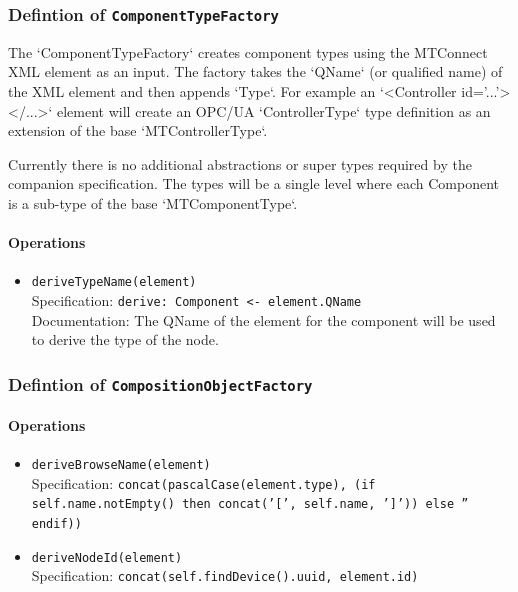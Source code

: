\subsubsection{Defintion of \texttt{ComponentTypeFactory}} \label{type:ComponentTypeFactory}

\FloatBarrier

The `ComponentTypeFactory` creates component types using the MTConnect XML element as an input. 
The factory takes the `QName` (or qualified name) of the XML element and then appends `Type`. For 
example an `<Controller id='...'></...>` element will create an OPC/UA `ControllerType` type definition 
as an extension of the base `MTControllerType`. 

Currently there is no additional abstractions or super types required by the companion specification. 
The types will be a single level where each Component is a sub-type of the base `MTComponentType`.


\paragraph{Operations}
\begin{itemize}
  \item \texttt{deriveTypeName(element)}\\
    Specification: \texttt{derive: Component <- element.QName}
\\
    Documentation: The QName of the element for the component will be used to derive the type of the node.

\end{itemize}
\subsubsection{Defintion of \texttt{CompositionObjectFactory}} \label{type:CompositionObjectFactory}

\FloatBarrier



\paragraph{Operations}
\begin{itemize}
  \item \texttt{deriveBrowseName(element)}\\
    Specification: \texttt{concat(pascalCase(element.type), (if self.name.notEmpty() then concat('[', self.name, ']')) else  '' endif))}

  \item \texttt{deriveNodeId(element)}\\
    Specification: \texttt{concat(self.findDevice().uuid, element.id)}

\end{itemize}
